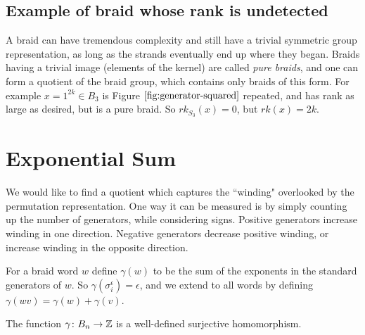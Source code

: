 \documentclass[12pt]{thesis}
\begin{document}
\subsection{Example of braid whose rank is undetected}

A braid can have tremendous complexity and still have a
trivial symmetric group representation, as long as the strands
eventually end up where they began.
Braids having a trivial image (elements of the kernel) are called \textit{pure braids},
and one can form a quotient of the braid group,
which contains only braids of this form.
For example $x = 1^{2k} \in B_{3}$ is Figure $\ref{fig:generator-squared}$ repeated,
and has rank as large as desired, but is a pure braid.
So $rk_{S_{3}}(x) = 0$, but $rk(x) = 2k$. 

\section{Exponential Sum}

We would like to find a quotient which captures
the ``winding" overlooked by the permutation representation.
One way it can be measured is by simply counting up the number of generators,
while considering signs.
Positive generators increase winding in one direction.
Negative generators decrease positive winding, or increase winding in the opposite direction.

    For a braid word $w$ define $\gamma(w)$ 
    to be the sum of the exponents in the standard generators of $w$.
    So $\gamma(\sigma_{i}^{\epsilon}) = \epsilon$,
    and we extend to all words by defining $\gamma(wv) = \gamma(w) + \gamma(v)$.

\begin{proposition}
    The function $\gamma \colon B_{n} \rightarrow \mathbb{Z}$ is a well-defined surjective homomorphism.
\end{proposition}
\end{document}

